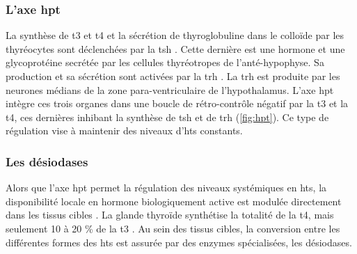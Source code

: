 \documentclass[../main.tex]{subfiles}
\begin{document}
		\subsubsection{L'axe \gls{hpt}}\label{subsubsec:hpt}
			La synthèse de \gls{t3} et \gls{t4} et la sécrétion de thyroglobuline dans le colloïde par les thyréocytes sont déclenchées par la \gls{tsh} \citep{Vagenakis1973}.
			Cette dernière est une hormone et une glycoprotéine secrétée par les cellules thyréotropes de l'anté-hypophyse.
			Sa production et sa sécrétion sont activées par la \gls{trh} \citep{Halasz1965}.
			La \gls{trh} est produite par les neurones médians de la zone para-ventriculaire de l'hypothalamus.
			L'axe  \gls{hpt} intègre ces trois organes dans une boucle de rétro-contrôle négatif par la \gls{t3} et la \gls{t4}, ces dernières inhibant la synthèse de \gls{tsh} \citep{Larsen1982} et de \gls{trh} \citep{Koller1987} (\autoref{fig:hpt}).
			Ce type de régulation vise à maintenir des niveaux d'\glspl{ht} constants.

			

		\subsubsection{Les désiodases}
			Alors que l'axe \gls{hpt} permet la régulation des niveaux systémiques en \glspl{ht}, la disponibilité locale en hormone biologiquement active est modulée directement dans les tissus cibles \citep{Bianco2006}.
			La glande thyroïde synthétise la totalité de la \gls{t4}, mais seulement 10 à 20 \% de la \gls{t3} \citep{Laurberg1984}.
			Au sein des tissus cibles, la conversion entre les différentes formes des \glspl{ht} est assurée par des enzymes spécialisées, les désiodases.

			
\end{document}
